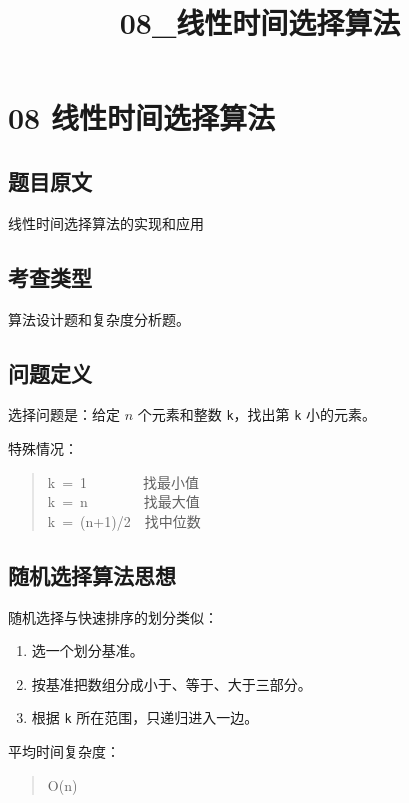 \documentclass[UTF8,zihao=-4]{ctexart}
\title{08\_线性时间选择算法}
\author{}
\date{}
\begin{document}
\maketitle

\section*{08 线性时间选择算法}

\subsection*{题目原文}

线性时间选择算法的实现和应用

\subsection*{考查类型}

算法设计题和复杂度分析题。

\subsection*{问题定义}

选择问题是：给定 $n$ 个元素和整数 \texttt{k}，找出第 \texttt{k} 小的元素。

特殊情况：

\begin{quote}
\small\ttfamily\raggedright
\relax k\ =\ 1\ \ \ \ \ \ \ \ 找最小值\\
\relax k\ =\ n\ \ \ \ \ \ \ \ 找最大值\\
\relax k\ =\ (n+1)/2\ \ 找中位数\\
\end{quote}

\subsection*{随机选择算法思想}

随机选择与快速排序的划分类似：

\begin{enumerate}
\item 选一个划分基准。
\item 按基准把数组分成小于、等于、大于三部分。
\item 根据 \texttt{k} 所在范围，只递归进入一边。
\end{enumerate}

平均时间复杂度：

\begin{quote}
\small\ttfamily\raggedright
\relax O(n)\\
\end{quote}
\end{document}
